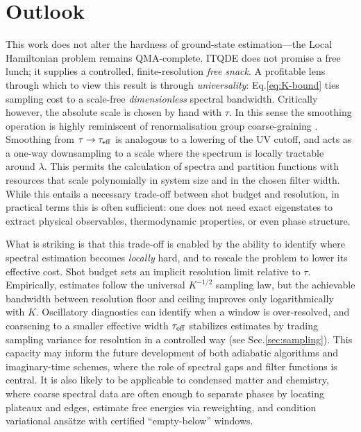\documentclass[reprint, aps,prx,showpacs,bibfootnote,preprintnumbers, mathtools, superscriptaddress, amsmath,amssymb]{revtex4-2}
\begin{document}
\section{Outlook \label{sec:Outlook}}
This work does not alter the hardness of ground-state estimation—the Local Hamiltonian problem remains QMA-complete. ITQDE does not promise a free lunch; it supplies a controlled, finite-resolution \textit{free snack}.  A profitable lens through which to view this result is through \textit{universality}: Eq.\eqref{eq:K-bound} ties sampling cost to a scale-free \textit{dimensionless} spectral bandwidth. Critically however, the absolute scale is chosen by hand with $\tau$. In this sense the smoothing operation is highly reminiscent of renormalisation group coarse-graining \cite{wilsonkogut1974}. Smoothing from $\tau \to \tau_{\rm eff}$ is analogous to a lowering of the UV cutoff, and acts as a one-way downsampling to a scale where the spectrum is locally tractable around $\lambda$. This permits the calculation of spectra and partition functions with resources that scale polynomially in system size and in the chosen filter width. While this entails a necessary trade-off between shot budget and resolution, in practical terms this is often sufficient: one does not need exact eigenstates to extract physical observables, thermodynamic properties, or even phase structure.

What is striking is that this trade-off is enabled by the ability to identify where spectral estimation becomes \textit{locally} hard, and to rescale the problem to lower its effective cost. Shot budget sets an implicit resolution limit relative to $\tau$. Empirically, estimates follow the universal $K^{-1/2}$ sampling law, but the achievable bandwidth between resolution floor and ceiling improves only logarithmically with $K$. Oscillatory diagnostics can identify when a window is over-resolved, and coarsening to a smaller effective width $\tau_{\rm eff}$  stabilizes estimates by trading sampling variance for resolution in a controlled way (see Sec.\ref{sec:sampling}). This capacity may inform the future development of both adiabatic algorithms and imaginary-time schemes, where the role of spectral gaps and filter functions is central. It is also likely to be applicable to condensed matter and chemistry, where coarse spectral data are often enough to separate phases by locating plateaux and edges, estimate free energies via reweighting, and condition variational ans{\"a}tze with certified “empty-below” windows.
\end{document}
